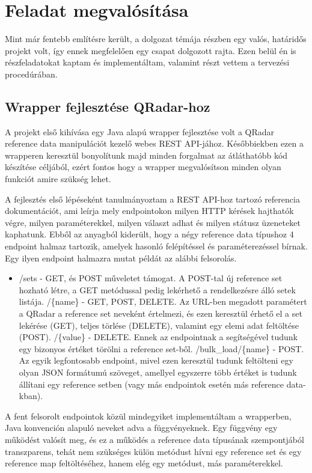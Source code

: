 \chapter{Feladat megvalósítása}
\label{ch:imp}
Mint már fentebb említésre került, a dolgozat témája részben egy valós, határidős projekt volt, így ennek megfelelően egy csapat dolgozott rajta. Ezen belül én is részfeladatokat kaptam és implementáltam, valamint részt vettem a tervezési procedúrában. 

\section{Wrapper fejlesztése QRadar-hoz}
A projekt első kihívása egy Java alapú wrapper fejlesztése volt a QRadar reference data manipulációt kezelő webes REST API-jához. Későbbiekben ezen a wrapperen keresztül bonyolítunk majd minden forgalmat az átláthatóbb kód készítése céljából, ezért fontos hogy a wrapper megvalósítson minden olyan funkciót amire szükség lehet.

A fejlesztés első lépéseként tanulmányoztam a REST API-hoz tartozó referencia dokumentációt, ami leírja mely endpointokon milyen HTTP kérések hajthatók végre, milyen paraméterekkel, milyen választ adhat és milyen státusz üzeneteket kaphatunk. Ebből az anyagból kiderült, hogy a négy reference data típushoz 4 endpoint halmaz tartozik, amelyek hasonló felépítéssel és paraméterezéssel bírnak. Egy ilyen endpoint halmazra mutat példát az alábbi felsorolás.

\begin{itemize}
	\item /sets - GET, és POST műveletet támogat. A POST-tal új reference set hozható létre, a GET metódussal pedig lekérhető a rendelkezésre álló setek listája.
		\subitem /\{name\} - GET, POST, DELETE. Az URL-ben megadott paramétert a QRadar a reference set neveként értelmezi, és ezen keresztül érhető el a set lekérése (GET), teljes törlése (DELETE), valamint egy elemi adat feltöltése (POST).
			\subsubitem /\{value\} - DELETE. Ennek az endpointnak a segítségével tudunk egy bizonyos értéket törölni a reference set-ből.
		\subitem /bulk\_load/\{name\} - POST. Az egyik legfontosabb endpoint, mivel ezen keresztül tudunk feltölteni egy olyan JSON formátumú szöveget, amellyel egyszerre több értéket is tudunk állítani egy reference setben (vagy más endpointok esetén más reference data-kban).
\end{itemize}

A fent felsorolt endpointok közül mindegyiket implementáltam a wrapperben, Java konvención alapuló neveket adva a függvényeknek. Egy függvény egy működést valósít meg, és ez a működés a reference data típusának szempontjából transzparens, tehát nem szükséges külön metódust hívni egy reference set és egy reference map feltöltéséhez, hanem elég egy metódust, más paraméterekkel.

